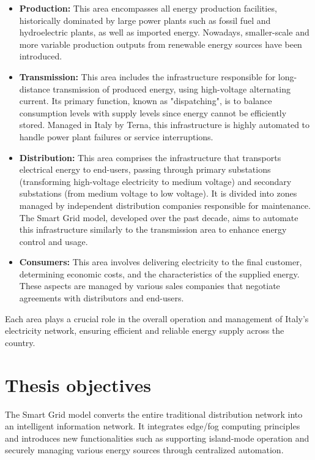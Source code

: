 \begin{itemize}
\item \textbf{Production:} This area encompasses all energy production facilities, historically dominated by large power plants such as fossil fuel and hydroelectric plants, as well as imported energy. Nowadays, smaller-scale and more variable production outputs from renewable energy sources have been introduced.
\item \textbf{Transmission:} This area includes the infrastructure responsible for long-distance transmission of produced energy, using high-voltage alternating current. Its primary function, known as "dispatching"\cite{i1-1}, is to balance consumption levels with supply levels since energy cannot be efficiently stored. Managed in Italy by Terna\cite{i1-2}, this infrastructure is highly automated to handle power plant failures or service interruptions.
\item \textbf{Distribution:} This area comprises the infrastructure that transports electrical energy to end-users, passing through primary substations (transforming high-voltage electricity to medium voltage) and secondary substations (from medium voltage to low voltage). It is divided into zones managed by independent distribution companies responsible for maintenance. The Smart Grid model, developed over the past decade, aims to automate this infrastructure similarly to the transmission area to enhance energy control and usage.
\item \textbf{Consumers:} This area involves delivering electricity to the final customer, determining economic costs, and the characteristics of the supplied energy. These aspects are managed by various sales companies that negotiate agreements with distributors and end-users.
\end{itemize}

Each area plays a crucial role in the overall operation and management of Italy's electricity network, ensuring efficient and reliable energy supply across the country.

\section{Thesis objectives}
The Smart Grid model converts the entire traditional distribution network into an intelligent information network. It integrates edge/fog computing principles and introduces new functionalities such as supporting island-mode operation and securely managing various energy sources through centralized automation.

